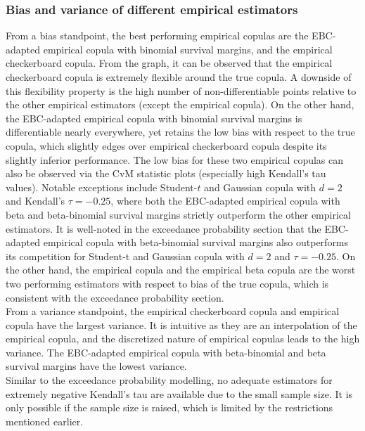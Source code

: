 \documentclass[12pt]{report}
\newcommand{\1}{\mathbf{1}}
\begin{document}
\begin{flushleft}
\subsubsection{Bias and variance of different empirical estimators}
From a bias standpoint, the best performing empirical copulas are the EBC-adapted empirical copula with binomial survival margins, and the empirical checkerboard copula. From the graph, it can be observed that the empirical checkerboard copula is extremely flexible around the true copula. A downside of this flexibility property is the high number of non-differentiable points relative to the other empirical estimators (except the empirical copula). On the other hand, the EBC-adapted empirical copula with binomial survival margins is differentiable nearly everywhere, yet retains the low bias with respect to the true copula, which slightly edges over empirical checkerboard copula despite its slightly inferior performance. The low bias for these two empirical copulas can also be observed via the CvM statistic plots (especially high Kendall's tau values). Notable exceptions include Student-$t$ and Gaussian copula with $d = 2$ and Kendall's $\tau = -0.25$, where both the EBC-adapted empirical copula with beta and beta-binomial survival margins strictly outperform the other empirical estimators. It is well-noted in the exceedance probability section that the EBC-adapted empirical copula with beta-binomial survival margins also outperforms its competition for Student-t and Gaussian copula with $d = 2$ and $\tau = -0.25$. On the other hand, the empirical copula and the empirical beta copula are the worst two performing estimators with respect to bias of the true copula, which is consistent with the exceedance probability section.\\
\vspace{0.5cm}
From a variance standpoint, the empirical checkerboard copula and empirical copula have the largest variance. It is intuitive as they are an interpolation of the empirical copula, and the discretized nature of empirical copulas leads to the high variance. The EBC-adapted empirical copula with beta-binomial and beta survival margins have the lowest variance.  \\
\vspace{0.5cm}
Similar to the exceedance probability modelling, no adequate estimators for extremely negative Kendall's tau are available due to the small sample size. It is only possible if the sample size is raised, which is limited by the restrictions mentioned earlier.


\end{flushleft}
\end{document}
